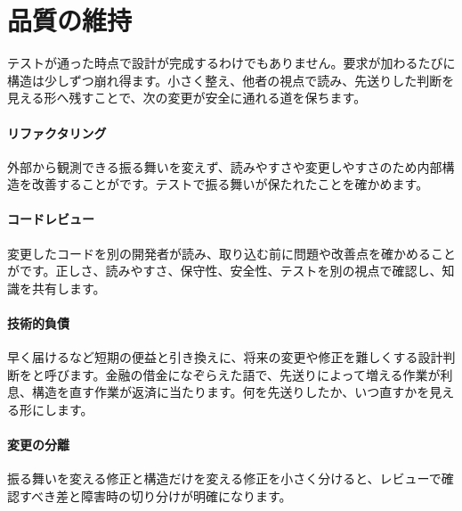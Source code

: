 \section{品質の維持}
\label{sec:04-software-engineering-19}

テストが通った時点で設計が完成するわけでもありません。要求が加わるたびに構造は少しずつ崩れ得ます。小さく整え、他者の視点で読み、先送りした判断を見える形へ残すことで、次の変更が安全に通れる道を保ちます。

\begingroup
\begingroup
\paragraph{リファクタリング}
        外部から観測できる振る舞いを変えず、読みやすさや変更しやすさのため内部構造を改善することがです。テストで振る舞いが保たれたことを確かめます。

\par
\endgroup
\medskip
\begingroup
\paragraph{コードレビュー}
        変更したコードを別の開発者が読み、取り込む前に問題や改善点を確かめることがです。正しさ、読みやすさ、保守性、安全性、テストを別の視点で確認し、知識を共有します。

\par
\endgroup
\medskip
\begingroup
\paragraph{技術的負債}
        早く届けるなど短期の便益と引き換えに、将来の変更や修正を難しくする設計判断をと呼びます。金融の借金になぞらえた語で、先送りによって増える作業が利息、構造を直す作業が返済に当たります。何を先送りしたか、いつ直すかを見える形にします。

\par
\endgroup
  \vspace{5mm}
\paragraph{変更の分離}
    振る舞いを変える修正と構造だけを変える修正を小さく分けると、レビューで確認すべき差と障害時の切り分けが明確になります。

\par
\endgroup


